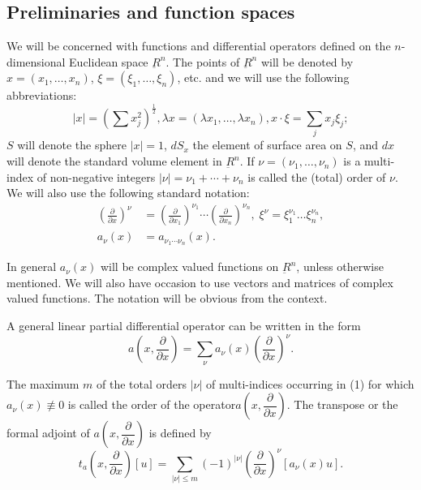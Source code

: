 \chapter{}\label{chap1}

\section{Preliminaries and function spaces}\pageoriginale\label{chap1-sec1}%

We will be concerned with functions and differential operators defined
on the $n$-dimensional  Euclidean space $\underbar{R}^n$. The points of
$\underbar{R}^n$ will be denoted by  $x = (x_1, \ldots, x_n)$, $\xi =
(\xi_1,  \ldots,  \xi_n)$, etc. and we will use the following
abbreviations: 
$$
|x|=\left(\sum x_j^2\right)^{\frac{1}{2}}, \lambda x =(\lambda x_1, \ldots, 
\lambda x_n), x\cdot \xi = \sum_j x_j \xi_j; 
$$
$S$ will denote the sphere $|x|=1$, $dS_x$ the element of surface area
on $S$, and $dx$ will denote the standard volume element in
$\underbar{R}^n$. If $\nu=(\nu_1, \ldots, \nu_n)$ is a multi-index of
non-negative integers $|\nu | =  \nu_1+ \cdots + \nu_n$ is called the
(total) order of $\nu$. We will also use the following standard
notation: 
\begin{align*}
\left(\frac{\partial}{\partial x}\right)^\nu & =\left(\frac{\partial}{\partial
    x_1}\right)^{\nu_1}\cdots\left(\frac{\partial}{\partial
  x_n}\right)^{\nu_n},  \; \xi^\nu 
  = \xi_1^{\nu_1} \ldots \xi_n^{\nu_n}, \\ 
  a_{\nu} (x) & = a_{\nu_1 \cdots \nu_n} (x).
\end{align*}

In general $a_\nu(x)$ will be complex valued functions on
$\underbar{R}^n$,  unless otherwise mentioned. We will also have
occasion to use vectors and matrices of complex valued functions. The
notation will be obvious from the context. 

A general linear partial differential operator can be written in the
form 
\begin{equation}
  a \left(x, \frac{\partial}{\partial x}\right) = \sum_\nu a_{\nu} (x)
\left(\frac{\partial}{\partial x}\right)^{\nu}. \tag{1.1} \label{chap1-eq1.1}
\end{equation}

The maximum $m$ of the total orders $| \nu |$ of multi-indices
occurring in (1) for which $a_{\nu}(x)\not \equiv 0$ is called the
order of the operator\pageoriginale $a \left(x,  \dfrac{\partial}{\partial
  x}\right)$. The 
transpose or the formal adjoint of $a\left(x,\dfrac{\partial}{\partial
  x}\right)$ is defined by 
\begin{equation*}
t_{a} \left(x, \frac{\partial}{\partial x}\right) [u] =\sum_{|\nu | \leq
  m}(-1)^{|\nu|} \left( \frac{\partial}{\partial x}\right)^{\nu}[a_\nu (x)
  u]. \tag{1.2} \label{chap1-eq1.2}
\end{equation*}

